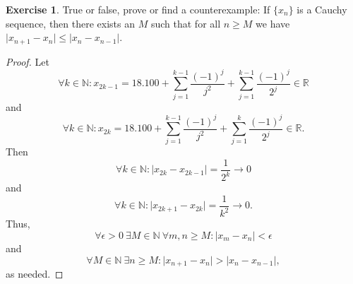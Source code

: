\documentclass[12pt]{article}
\theoremstyle{definition}
\newtheorem{exercise}{Exercise}
\begin{document}
\begin{exercise}
    True or false, prove or find a counterexample: If $\{x_n\}$ is a Cauchy sequence, then there exists an $M$ such that for all $n \geq M$ we have $\vert x_{n + 1} - x_n \vert \leq \vert x_n - x_{n - 1} \vert$.
\end{exercise}

\begin{proof}
    Let
    \[
        \forall k \in \mathbb{N} : x_{2k - 1} = 18.100 + \sum_{j = 1}^{k - 1}\frac{(-1)^j}{j^2} + \sum_{j = 1}^{k - 1}\frac{(-1)^j}{2^j} \in \mathbb{R}
    \]
    and
    \[
        \forall k \in \mathbb{N} : x_{2k} = 18.100 + \sum_{j = 1}^{k - 1}\frac{(-1)^j}{j^2} + \sum_{j = 1}^{k}\frac{(-1)^j}{2^j} \in \mathbb{R}.
    \]
    Then
    \[
        \forall k \in \mathbb{N} : \vert x_{2k} - x_{2k - 1} \vert = \frac{1}{2^k} \to 0
    \]
    and
    \[
        \forall k \in \mathbb{N} : \vert x_{2k + 1} - x_{2k} \vert = \frac{1}{k^2} \to 0.
    \]
    Thus,
    \[
        \forall \epsilon > 0 \ \exists M \in \mathbb{N} \ \forall m,n \geq M : \vert x_m - x_n \vert < \epsilon
    \]
    and
    \[
        \forall M \in \mathbb{N} \ \exists n \geq M : \vert x_{n + 1} - x_n \vert > \vert x_n - x_{n - 1} \vert,
    \]
    as needed.
\end{proof}
\end{document}
